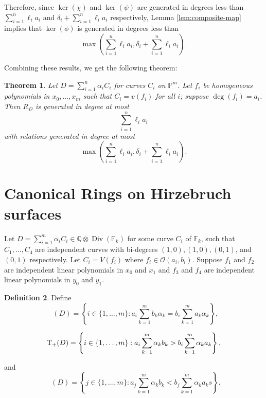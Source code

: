 \documentclass{amsart}
\theoremstyle{plain}
\newtheorem{thm}{Theorem}[section]
\theoremstyle{definition}
\newtheorem{defn}[thm]{Definition}
\theoremstyle{remark}
\numberwithin{equation}{section}
\DeclareMathOperator\di{Div}
\newcommand\bida{a}
\newcommand\bidb{b}
\newcommand\hirz{\mathbb{F}}
\DeclareMathOperator{\Te}{T_=}
\DeclareMathOperator{\Tp}{T_+}
\DeclareMathOperator{\Tm}{T_-}
\begin{document}
Therefore, since $\ker(\chi)$ and $\ker(\psi)$ are generated in degrees less than $\sum_{i=1}^n \ell_i a_i$ and $\delta_i + \sum_{i=1}^n \ell_i a_i$ respectively, Lemma \ref{lem:composite-map} implies that $\ker(\phi)$ is generated in degrees less than
\[
	\max \left(\sum_{i=1}^n \ell_i a_i, \delta_i + \sum_{i=1}^n \ell_i a_i \right).
\]

Combining these results, we get the following theorem:

\begin{thm}\label{P-m-generators/relations}
Let $D = \sum_{i=1}^n \alpha_i C_i$ for curves $C_i$ on $\mathbb{P}^m$.  Let $f_i$ be homogeneous polynomials in $x_0, \ldots, x_m$ such that $C_i = v(f_i)$ for all $i$; suppose $\deg(f_i) = a_i$. 
Then $R_D$ is generated in degree at most 
\[
	\sum_{i=1}^n \ell_i a_i
\]
with relations generated in degree at most
\[
	\max \left(\sum_{i=1}^n \ell_i a_i, \delta_i + \sum_{i=1}^n \ell_i a_i \right).
\]
\end{thm}

\section{Canonical Rings on Hirzebruch surfaces}
Let $D=\sum_{i=1}^m \alpha_i C_i \in \mathbb{Q} \otimes \di(\hirz_
k)$ for some curve $C_i$ of $\hirz_k$, such
that $C_1, \ldots, C_4$ are independent curves with bi-degrees $(1,0)
, (1,0), (0,1)$, and $(0,1)$ respectively. Let $C_i = V(f_i)$ where
$f_i \in \mathscr{O}(\bida_i, \bidb_i)$.  Suppose $f_1$ and $f_2$ are independent linear
polynomials in $x_0$ and $x_1$ and $f_3$ and $f_4$ are independent
linear polynomials in $y_0$ and $y_1$.

\begin{defn}
Define 
\begin{equation}\label{eqn:define-T=(D)}
	\Te(D) = \left\{i \in \{1, \ldots, m\}: \bida_i \sum_{k=1}^m \bidb_k 
\alpha_k = \bidb_i \sum_{k=1}^m \bida_k \alpha_k \right\},
\end{equation}

\begin{equation}\label{eqn:define-T+(D)}
	\Tp(D) = \left\{ i \in \{1, \ldots, m\}:  \vphantom{\sum_{k=1}^m} 
\bida_i \sum_{k=1}^m \alpha_k \bidb_k > \bidb_i \sum_{k=1}^m \alpha_k \bida_k 
\right\},
\end{equation}

\noindent
and
\begin{equation}\label{eqn:define-T-(D)}
	\Tm(D) = \left\{ j \in \{1, \ldots, m\}: \bida_j \sum_{k=1}^m \alpha_
k \bidb_k < \bidb_j \sum_{k=1}^m \alpha_k \bida_k s \right\}.
\end{equation}
\end{defn}
\end{document}
